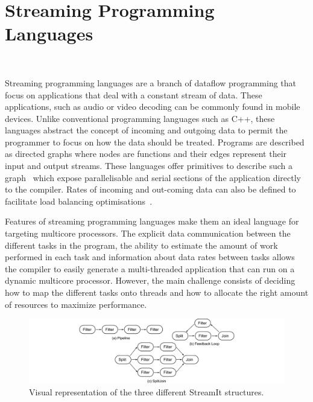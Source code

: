 \section{Streaming Programming Languages}~\label{sec:bg:stream}


Streaming programming languages are a branch of dataflow programming that focus on applications that deal with a constant stream of data.
These applications, such as audio or video decoding can be commonly found in mobile devices.
Unlike conventional programming languages such as C++, these languages abstract the concept of incoming and outgoing data to permit the programmer to focus on how the data should be treated.
Programs are described as directed graphs where nodes are functions and their edges represent their input and output streams. 
These languages offer primitives to describe such a graph~\cite{theis2002streamit} which expose parallelisable and serial sections of the application directly to the compiler. 
Rates of incoming and out-coming data can also be defined to facilitate load balancing optimisations~\cite{chen2005rawstream}.

Features of streaming programming languages make them an ideal language for targeting multicore processors.
The explicit data communication between the different tasks in the program, the ability to estimate the amount of work performed in each task and information about data rates between tasks allows the compiler to easily generate a multi-threaded application that can run on a dynamic multicore processor.
However, the main challenge consists of deciding how to map the different tasks onto threads and how to allocate the right amount of resources to maximize performance.


\begin{figure}[t]
    \centering
    \includegraphics[width=1\textwidth]{streamit-paper/graphics/streamit_types.pdf}
    \caption{Visual representation of the three different StreamIt structures.}
    \label{fig:streamittypes}
		\vspace{-1em}

\end{figure}

